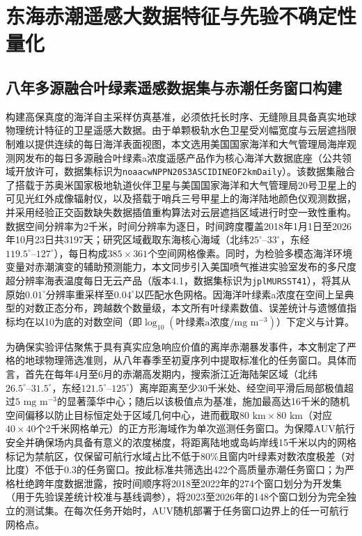 \section{东海赤潮遥感大数据特征与先验不确定性量化}

\subsection{八年多源融合叶绿素遥感数据集与赤潮任务窗口构建}

构建高保真度的海洋自主采样仿真基准，必须依托长时序、无缝隙且具备真实地球物理统计特征的卫星遥感大数据。由于单颗极轨水色卫星受刈幅宽度与云层遮挡限制难以提供连续的每日海洋表面视图，本文选用美国国家海洋和大气管理局海岸观测网发布的每日多源融合叶绿素a浓度遥感产品作为核心海洋大数据底座（公共领域开放许可，数据集标识为\texttt{noaacwNPPN20S3ASCIDINEOF2kmDaily}）。该数据集融合了搭载于苏奥米国家极地轨道伙伴卫星与美国国家海洋和大气管理局20号卫星上的可见光红外成像辐射仪，以及搭载于哨兵三号甲星上的海洋陆地颜色仪观测数据，并采用经验正交函数缺失数据插值重构算法对云层遮挡区域进行时空一致性重构\cite{beckers2003dineof}。数据空间分辨率为2千米，时间分辨率为逐日，时间跨度覆盖2018年1月1日至2026年10月23日共3197天；研究区域截取东海核心海域（北纬$25^\circ\text{--}33^\circ$，东经$119.5^\circ\text{--}127^\circ$），每日构成$385\times 361$个空间网格像素。同时，为检验多模态海洋环境变量对赤潮演变的辅助预测能力，本文同步引入美国喷气推进实验室发布的多尺度超分辨率海表温度每日无云产品（版本4.1，数据集标识为\texttt{jplMURSST41}）\cite{chin2017mur}，将其从原始$0.01^\circ$分辨率重采样至$0.04^\circ$以匹配水色网格。因海洋叶绿素a浓度在空间上呈典型的对数正态分布，跨越数个数量级，本文所有叶绿素数值、误差统计与遗憾值指标均在以10为底的对数空间（即$\log_{10}(\text{叶绿素a浓度}/\text{mg m}^{-3})$）下定义与计算。

为确保实验评估聚焦于具有真实应急响应价值的离岸赤潮暴发事件，本文制定了严格的地球物理筛选准则，从八年春季至初夏序列中提取标准化的任务窗口。具体而言，首先在每年4月至6月的赤潮高发期内，搜索浙江近海陆架区域（北纬$26.5^\circ\text{--}31.5^\circ$，东经$121.5^\circ\text{--}125^\circ$）离岸距离至少30千米处、经空间平滑后局部极值超过$5\text{ mg m}^{-3}$的显著藻华中心；随后以该极值点为基准，施加最高达16千米的随机空间偏移以防止目标恒定处于区域几何中心，进而截取$80\text{ km}\times 80\text{ km}$（对应$40\times 40$个2千米网格单元）的正方形海域作为单次巡测任务窗口。为保障AUV航行安全并确保场内具备有意义的浓度梯度，将距离陆地或岛屿岸线15千米以内的网格标记为禁航区，仅保留可航行水域占比不低于80\%且窗内叶绿素对数浓度极差（对比度）不低于0.3的任务窗口。按此标准共筛选出422个高质量赤潮任务窗口；为严格杜绝跨年度数据泄露，按时间顺序将2018至2022年的274个窗口划分为开发集（用于先验误差统计校准与基线调参），将2023至2026年的148个窗口划分为完全独立的测试集。在每次任务开始时，AUV随机部署于任务窗口边界上的任一可航行网格点。

